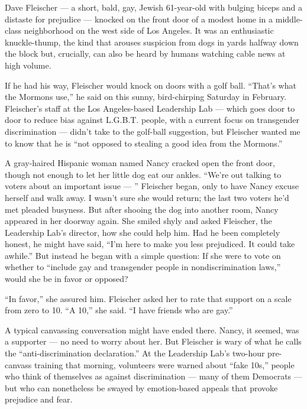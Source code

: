 Dave Fleischer --- a short, bald, gay, Jewish 61-year-old with bulging
biceps and a distaste for prejudice --- knocked on the front door of a
modest home in a middle-class neighborhood on the west side of Los
Angeles. It was an enthusiastic knuckle-thump, the kind that arouses
suspicion from dogs in yards halfway down the block but, crucially, can
also be heard by humans watching cable news at high volume.

If he had his way, Fleischer would knock on doors with a golf ball.
``That's what the Mormons use,'' he said on this sunny, bird-chirping
Saturday in February. Fleischer's staff at the Los Angeles-based
Leadership Lab --- which goes door to door to reduce bias against
L.G.B.T. people, with a current focus on transgender discrimination ---
didn't take to the golf-ball suggestion, but Fleischer wanted me to know
that he is ``not opposed to stealing a good idea from the Mormons.''

A gray-haired Hispanic woman named Nancy cracked open the front door,
though not enough to let her little dog eat our ankles. ``We're out
talking to voters about an important issue --- '' Fleischer began, only
to have Nancy excuse herself and walk away. I wasn't sure she would
return; the last two voters he'd met pleaded busyness. But after shooing
the dog into another room, Nancy appeared in her doorway again. She
smiled shyly and asked Fleischer, the Leadership Lab's director, how she
could help him. Had he been completely honest, he might have said, ``I'm
here to make you less prejudiced. It could take awhile.'' But instead he
began with a simple question: If she were to vote on whether to
``include gay and transgender people in nondiscrimination laws,'' would
she be in favor or opposed?

``In favor,'' she assured him. Fleischer asked her to rate that support
on a scale from zero to 10. ``A 10,'' she said. ``I have friends who are
gay.''

A typical canvassing conversation might have ended there. Nancy, it
seemed, was a supporter --- no need to worry about her. But Fleischer is
wary of what he calls the ``anti-discrimination declaration.'' At the
Leadership Lab's two-hour pre-canvass training that morning, volunteers
were warned about ``fake 10s,'' people who think of themselves as
against discrimination --- many of them Democrats --- but who can
nonetheless be swayed by emotion-based appeals that provoke prejudice
and fear.


